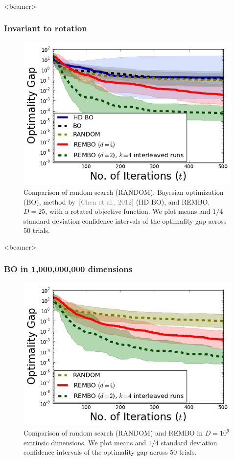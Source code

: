\documentclass[grey]{beamer}
\begin{document}
 \begin{frame}<beamer>
  \frametitle{Invariant to rotation}
  \begin{figure}
   \includegraphics[width=0.6\columnwidth]{../paper/figures/branin_dis_rot.png}
   \caption{Comparison of random search (RANDOM), Bayesian optimization (BO),
     method by~\textcolor{gray}{[Chen et al., 2012]} (HD BO), and REMBO.
     $D=25$, with a rotated objective function. We plot means and $1/4$ standard deviation confidence intervals of the optimality gap across 50 trials.}
   \label{fig:standard}
  \end{figure}
 \end{frame}

 
 
 
 \begin{frame}<beamer>
  \frametitle{BO in 1,000,000,000 dimensions}
  \begin{figure}
   \includegraphics[width=0.6\columnwidth]{../paper/figures/branin_dis_1b.png}
   \caption{Comparison of random search (RANDOM) and REMBO
     in $D=10^9$ extrinsic dimensions. 
     We plot means and $1/4$ standard deviation confidence intervals of the optimality gap across $50$ trials.}
   \label{fig:standard}
  \end{figure}
 \end{frame}
 
\end{document}
